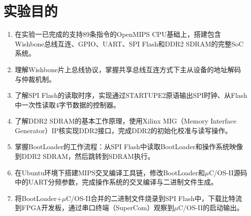 \section{实验目的}

\begin{enumerate}[leftmargin=2em]
    \item 在实验一已完成的支持89条指令的OpenMIPS CPU基础上，搭建包含Wishbone总线互连、GPIO、UART、SPI Flash和DDR2 SDRAM的完整SoC系统。
    \item 理解Wishbone片上总线协议，掌握共享总线互连方式下主从设备的地址解码与仲裁机制。
    \item 了解SPI Flash的读取时序，实现通过STARTUPE2原语输出SPI时钟、从Flash中一次性读取4字节数据的控制器。
    \item 了解DDR2 SDRAM的基本工作原理，使用Xilinx MIG（Memory Interface Generator）IP核实现DDR2接口，完成DDR2的初始化校准与读写操作。
    \item 掌握BootLoader的工作流程：从SPI Flash中读取BootLoader和操作系统映像到DDR2 SDRAM，然后跳转到SDRAM执行。
    \item 在Ubuntu环境下搭建MIPS交叉编译工具链，修改BootLoader和$\mu$C/OS-II源码中的UART分频参数，完成操作系统的交叉编译与二进制文件生成。
    \item 将BootLoader+$\mu$C/OS-II合并的二进制文件烧录到SPI Flash中，下载比特流到FPGA开发板，通过串口终端（SuperCom）观察到$\mu$C/OS-II的启动输出。
\end{enumerate}
